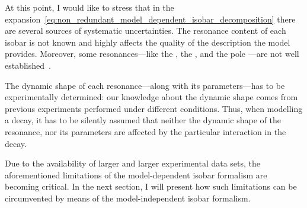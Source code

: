     At this point, I would like to stress that in the expansion~\eqref{eq:non_redundant_model_dependent_isobar_decomposition} there are several sources of systematic uncertainties.
    The resonance content of each isobar is not known and highly affects the quality of the description the model provides.
    Moreover, some resonances---like the \Pfnez{}, the \Pfotsz, and the pole \Psigma{}---are not well established~\cite[\S~B]{PhysRevD.76.012001}.


    The dynamic shape of each resonance---along with its parameters---has to be experimentally determined: our knowledge about the dynamic shape comes from previous experiments performed under different conditions.
    Thus, when modelling a decay, it has to be silently assumed that neither the dynamic shape of the resonance, nor its parameters are affected by the particular interaction in the decay.


    Due to the availability of larger and larger experimental data sets, the aforementioned limitations of the model-dependent isobar formalism are becoming critical.
    In the next section, I will present how such limitations can be circumvented by means of the model-independent isobar formalism.



